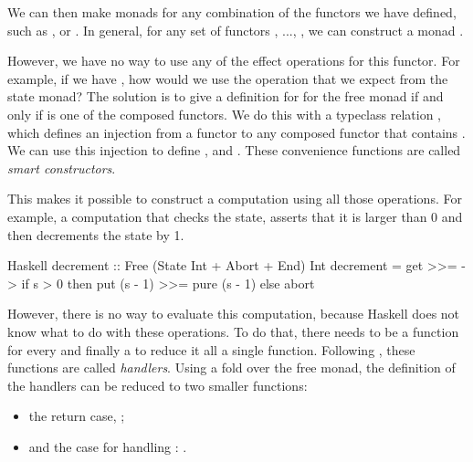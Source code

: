 We can then make monads for any combination of the functors we have defined, such as ,  or . In general, for any set of functors , ..., , we can construct a monad .

However, we have no way to use any of the effect operations for this functor. For example, if we have , how would we use the  operation that we expect from the state monad? The solution is to give a definition for  for the free monad if and only if  is one of the composed functors. We do this with a typeclass relation \hs{<}, which defines an injection from a functor  to any composed functor  that contains . We can use this injection to define ,  and . These convenience functions are called \emph{smart constructors}.


This makes it possible to construct a computation using all those operations. For example, a computation that checks the state, asserts that it is larger than 0 and then decrements the state by 1.

\begin{lst}{Haskell}
decrement :: Free (State Int + Abort + End) Int
decrement = get >>= \s ->
              if s > 0
              then put (s - 1) >>= pure (s - 1)
              else abort 
\end{lst}

However, there is no way to evaluate this computation, because Haskell does not know what to do with these operations. To do that, there needs to be a function  for every  and finally a  to reduce it all a single function. Following \textcite{castagna_handlers_2009}, these functions are called \emph{handlers}. Using a fold over the free monad, the definition of the handlers can be reduced to two smaller functions:
\begin{itemize}
    \item the return case, ;
    \item and the case for handling : .
\end{itemize}

